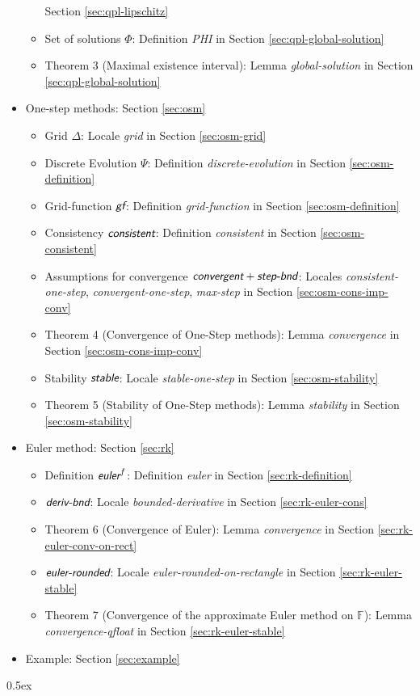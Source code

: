 \documentclass[11pt,a4paper]{article}
\newcommand{\Float}{\mathbb{F}}
\newcommand{\keyword}[1]{\ensuremath{\textsl{\textsf{#1}}}}
\newcommand{\Kboundedderiv}{\keyword{deriv-bnd}}
\newcommand{\Kconsistent}{\keyword{consistent}}
\newcommand{\Kconvergent}{\keyword{convergent}}
\newcommand{\Keuler}{\keyword{euler}}
\newcommand{\Keulerround}{\keyword{euler-rounded}}
\newcommand{\Kgridfunction}{\keyword{gf}}
\newcommand{\Kmaxstep}{\keyword{step-bnd}}
\newcommand{\Kstable}{\keyword{stable}}
\begin{document}
\begin{itemize}
\begin{itemize}
    Section \ref{sec:qpl-lipschitz}
  \item Set of solutions $\Phi$: Definition \textit{PHI} in Section \ref{sec:qpl-global-solution}
  \item Theorem 3 (Maximal existence interval): Lemma \textit{global-solution} in
    Section \ref{sec:qpl-global-solution}
  \end{itemize}
\item One-step methods: Section \ref{sec:osm}
  \begin{itemize}
  \item Grid $\Delta$: Locale \textit{grid} in Section \ref{sec:osm-grid}
  \item Discrete Evolution $\Psi$: Definition
    \textit{discrete-evolution} in Section \ref{sec:osm-definition}
  \item Grid-function $\Kgridfunction$: Definition
    \textit{grid-function} in Section \ref{sec:osm-definition}
  \item Consistency $\Kconsistent$: Definition \textit{consistent} in
    Section \ref{sec:osm-consistent}
  \item Assumptions for convergence $\Kconvergent + \Kmaxstep$:
    Locales \textit{consistent-one-step},
    \textit{convergent-one-step}, \textit{max-step} in Section
    \ref{sec:osm-cons-imp-conv}
  \item Theorem 4 (Convergence of One-Step methods): Lemma
    \textit{convergence} in Section \ref{sec:osm-cons-imp-conv}
  \item Stability $\Kstable$: Locale \textit{stable-one-step} in
    Section \ref{sec:osm-stability}
  \item Theorem 5 (Stability of One-Step methods): Lemma
    \textit{stability} in Section \ref{sec:osm-stability}
 \end{itemize}
\item Euler method: Section \ref{sec:rk}
  \begin{itemize}
  \item Definition $\Keuler^f$: Definition \textit{euler} in Section
    \ref{sec:rk-definition}
  \item $\Kboundedderiv$: Locale \textit{bounded-derivative} in
    Section \ref{sec:rk-euler-cons}
  \item Theorem 6 (Convergence of Euler): Lemma \textit{convergence} in
    Section \ref{sec:rk-euler-conv-on-rect}
  \item $\Keulerround$: Locale \textit{euler-rounded-on-rectangle} in
    Section \ref{sec:rk-euler-stable}
  \item Theorem 7 (Convergence of the approximate Euler method on
    $\Float$): Lemma \textit{convergence-qfloat} in Section
    \ref{sec:rk-euler-stable}
  \end{itemize}
\item Example: Section \ref{sec:example}
\end{itemize}

\tableofcontents

\parindent 0pt\parskip 0.5ex





\end{document}

